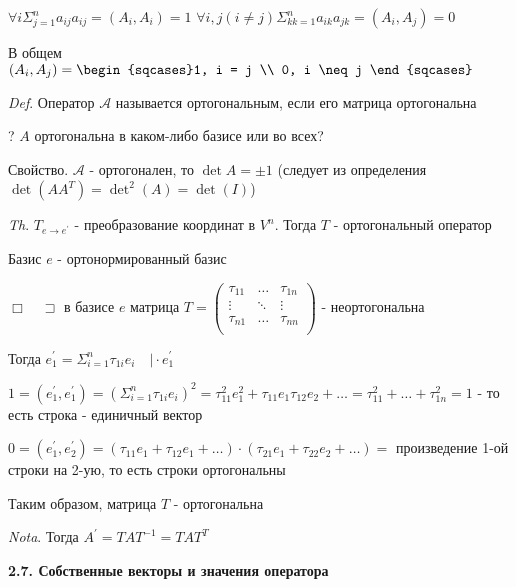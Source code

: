\documentclass[12pt]{article}
\begin{document}
    $\displaystyle \forall i \Sigma^n_{j=1} a_{ij} a_{ij} = (A_i, A_i) = 1$
    $\displaystyle \forall i, j (i \neq j) \Sigma^n_{kk=1} a_{ik} a_{jk} = (A_i, A_j) = 0$

    В общем $(A_i, A_j) = \begin{sqcases}1, i = j \\ 0, i \neq j \end{sqcases}$

    \vspace{3mm}
\textit{Def}. Оператор $\mathcal{A}$ называется ортогональным, если его матрица ортогональна

    ? $A$ ортогональна в каком-либо базисе или во всех?

    Свойство. $\mathcal{A}$ - ортогонален, то $\det A = \pm 1$ (следует из определения $\det(AA^T) = \det^2(A) = \det(I)$)

    \vspace{3mm}
\textit{Th}. $T_{e\to e^\prime}$ - преобразование координат в $V^n$. Тогда $T$ - ортогональный оператор

    Базис $e$ - ортонормированный базис

    $\Box \quad \sqsupset $ в базисе $e$ матрица $T = \begin{pmatrix}
          \tau_{11} & \dots & \tau_{1n} \\
          \vdots & \ddots & \vdots \\
          \tau_{n1} & \dots & \tau_{nn} \\
    \end{pmatrix}$ - неортогональна

    Тогда $\displaystyle e_1^\prime = \Sigma_{i=1}^n \tau_{1i} e_i \quad \Big| \cdot e_1^\prime$

    $\displaystyle 1 = (e_1^\prime, e_1^\prime) = (\Sigma_{i=1}^n \tau_{1i} e_i)^2 =
    \tau^2_{11} e^2_1 + \tau_{11} e_1 \tau_{12} e_2 + \dots = \tau_{11}^2 + \dots + \tau_{1n}^2 = 1$ - то есть строка - единичный вектор

    $0 = (e_1^\prime, e_2^\prime) = (\tau_{11} e_1 + \tau_{12}e_1 + \dots) \cdot
    (\tau_{21}e_1 + \tau_{22}e_2 + \dots) = $ произведение 1-ой строки на 2-ую, то есть строки ортогональны

    Таким образом, матрица $T$ - ортогональна

    \vspace{3mm}
\textit{Nota}. Тогда $A^\prime = T A T^{-1} = T A T^T$

    \vspace{10mm}
    \textbf{2.7. Собственные векторы и значения оператора}
\end{document}
